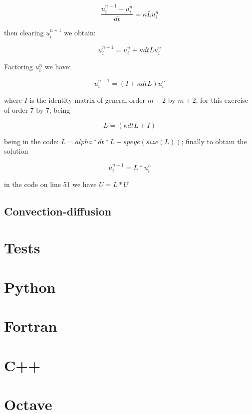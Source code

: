 \documentclass[a4paper,abstract=true]{scrreprt}
\begin{document}
\begin{equation}
	\frac{u^{n+1}_{i} - u^{n}_{i} }{dt} = \kappa L 	u^{n}_{i}
\end{equation}

then clearing $u^{n+1}_{i}$ we obtain:


\begin{equation}
	u^{n+1}_{i} = u^{n}_{i}  +  \kappa dt L u^{n}_{i}
\end{equation}

Factoring $u^{n}_{i}$ we have:

\begin{equation}
	u^{n+1}_{i} = (I  +  \kappa dt L )u^{n}_{i}
\end{equation}

where $I$ is the identity matrix of general order $m+2$ by $m+2$, for this exercise of order $7$ by $7$, being

$$  L = (\kappa dt L +I )$$

being in the code: $ L = alpha*dt*L + speye(size(L))$; finally to obtain the solution

\begin{equation}
	u^{n+1}_{i} = L *u^{n}_{i}
\end{equation}

in the code on line 51 we have $ U = L*U$






\section{Convection-diffusion}

\chapter{Tests}

\chapter{Python}

\chapter{Fortran}

\chapter{C++}

\chapter{Octave}

\nocite{*}
\printbibliography[title={Referencias}]
\end{document}
